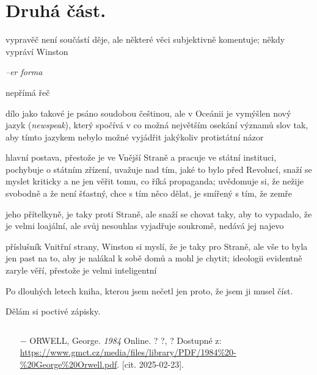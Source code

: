 \documentclass{article}
\begin{document}
\section{Druhá část.}
\begin{description}
    \setlength\itemsep{0.15em}
    \item[vypravěč:] vypravěč není součástí děje, ale některé věci subjektivně komentuje; někdy vypráví Winston
    \item[vyprávěcí způsoby:] \textit{--er forma}
    \item[typy promluv:] nepřímá řeč
    \item[jazyková stránka:] dílo jako takové je psáno soudobou češtinou, ale v Oceánii je vymýšlen nový jazyk (\textit{newspeak}),
        který spočívá v co možná největším osekání významů slov tak, aby tímto jazykem nebylo možné vyjádřit jakýkoliv protistátní názor
    \item[postavy:]
        \begin{description}
            \setlength\itemsep{0.15em}
           	\item[Winston,] hlavní postava, přestože je ve Vnější Straně a pracuje ve státní instituci, pochybuje o
                státním zřízení, uvažuje nad tím, jaké to bylo před Revolucí, snaží se myslet kriticky a ne jen
                věřit tomu, co říká propaganda; uvědomuje si, že nežije svobodně a že není šťastný, chce s tím něco dělat,
                je smířený s tím, že zemře
           	\item[Julie,] jeho přítelkyně, je taky proti Straně, ale snaží se chovat taky, aby to vypadalo, že je velmi loajální,
                ale svůj nesouhlas vyjadřuje soukromě, nedává jej najevo
            \item[O`Brien,] příslušník Vnitřní strany, Winston si myslí, že je taky pro Straně, ale vše to byla jen past na to,
                aby je nalákal k sobě domů a mohl je chytit; ideologii evidentně zaryle věří, přestože je velmi inteligentní
        \end{description}
    \item[názor:] Po dlouhých letech kniha, kterou jsem nečetl jen proto, že jsem ji musel číst.
    \item[kontext:]  Dělám si poctivé zápisky.
    \item[zdroje:] $ $
    \begin{itemize}
        \setlength\itemsep{0em}
        \item[$-$] ORWELL, George. \textit{1984} Online. ? ?, ? Dostupné z: \url{https://www.gmct.cz/media/files/library/PDF/1984%20-%20George%20Orwell.pdf}. [cit. 2025-02-23].
    \end{itemize}
\end{description}
\end{document}
